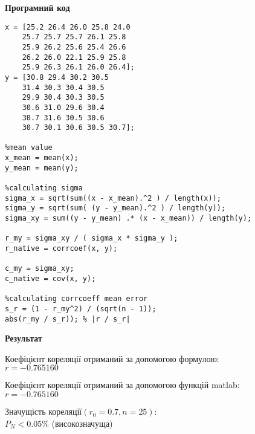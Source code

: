 \documentclass[12pt]{article}
\begin{document}
\newpage
\begin{center}
    {\Large \bf Програмний код}
\end{center}

\begin{lstlisting}
x = [25.2 26.4 26.0 25.8 24.0
    25.7 25.7 25.7 26.1 25.8
    25.9 26.2 25.6 25.4 26.6
    26.2 26.0 22.1 25.9 25.8
    25.9 26.3 26.1 26.0 26.4];
y = [30.8 29.4 30.2 30.5
    31.4 30.3 30.4 30.5
    29.9 30.4 30.3 30.5
    30.6 31.0 29.6 30.4
    30.7 31.6 30.5 30.6
    30.7 30.1 30.6 30.5 30.7];

%mean value
x_mean = mean(x);
y_mean = mean(y);

%calculating sigma
sigma_x = sqrt(sum((x - x_mean).^2 ) / length(x));
sigma_y = sqrt(sum( (y - y_mean).^2 ) / length(y));
sigma_xy = sum((y - y_mean) .* (x - x_mean)) / length(y);

r_my = sigma_xy / ( sigma_x * sigma_y );
r_native = corrcoef(x, y);

c_my = sigma_xy;
c_native = cov(x, y);

%calculating corrcoeff mean error
s_r = (1 - r_my^2) / (sqrt(n - 1));
abs(r_my / s_r)); % |r / s_r|
\end{lstlisting}


\newpage
\begin{center}
    {\Large \bf Результат}
\end{center}

\noindent Коефіцієнт кореляції отриманий за допомогою формулою:\\
$r = -0.765160$

\noindent Коефіцієнт кореляції отриманий за допомогою функцій matlab:\\
$r = -0.765160$

\noindent Значущість кореляції$(r_0 = 0.7, n = 25)$:\\
$P_N < 0.05\%$ (високозначуща)
\end{document}
